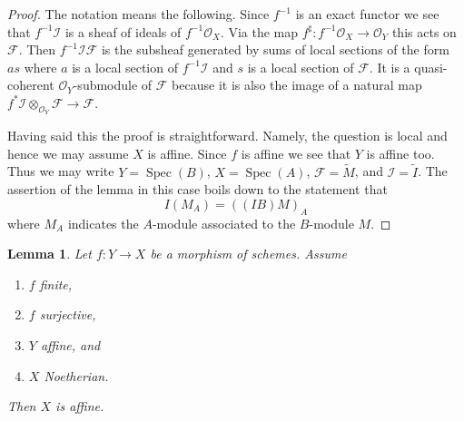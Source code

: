 \documentclass{stacks-project}
\theoremstyle{plain}
\newtheorem{lemma}[subsection]{Lemma}
\theoremstyle{definition}
\theoremstyle{remark}
\numberwithin{equation}{subsection}
\def\Spec{\mathop{\mathrm{Spec}}}
\begin{document}
\begin{proof}
The notation means the following. Since $f^{-1}$ is an exact functor
we see that $f^{-1}\mathcal{I}$ is a sheaf
of ideals of $f^{-1}\mathcal{O}_X$. Via the map
$f^\sharp : f^{-1}\mathcal{O}_X \to \mathcal{O}_Y$ this acts on
$\mathcal{F}$. Then $f^{-1}\mathcal{I}\mathcal{F}$ is the subsheaf
generated by sums of local sections of the form $as$ where $a$
is a local section of $f^{-1}\mathcal{I}$ and $s$ is a local section
of $\mathcal{F}$. It is a quasi-coherent $\mathcal{O}_Y$-submodule
of $\mathcal{F}$ because it is also the image of a natural map
$f^*\mathcal{I} \otimes_{\mathcal{O}_Y} \mathcal{F} \to \mathcal{F}$.

\medskip\noindent
Having said this the proof is straightforward. Namely, the question is local
and hence we may assume $X$ is affine. Since $f$ is affine we see that
$Y$ is affine too. Thus we may write
$Y = \Spec(B)$, $X = \Spec(A)$, $\mathcal{F} = \widetilde{M}$,
and $\mathcal{I} = \widetilde{I}$. The assertion of the lemma in this
case boils down to the statement that
$$
I(M_A) = ((IB)M)_A
$$
where $M_A$ indicates the $A$-module associated to the $B$-module $M$.
\end{proof}

\begin{lemma}
\label{lemma-image-affine-finite-morphism-affine-Noetherian}
Let $f : Y \to X$ be a morphism of schemes.
Assume
\begin{enumerate}
\item $f$ finite,
\item $f$ surjective,
\item $Y$ affine, and
\item $X$ Noetherian.
\end{enumerate}
Then $X$ is affine.
\end{lemma}
\end{document}
